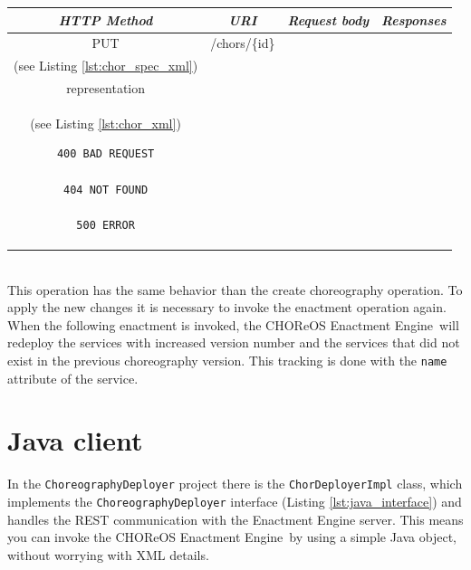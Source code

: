 \documentclass[a4paper, 10pt]{article}
\newcommand{\ee}{CHOReOS Enactment Engine}
\begin{document}
\begin{tabular}{|c|c|c|c|}
\hline 
\itshape{HTTP Method} & \itshape{URI} & \itshape{Request body} & \itshape{Responses} \\ 
\hline 
PUT & /chors/\{id\} & 

\begin{minipage}{2in}
\verb!ChorSpec! XML representation \\ 
(see Listing \ref{lst:chor_spec_xml})
\end{minipage} 
&
\begin{minipage}{2in}
\begin{verbatim}

200 OK
location = "/chors/{id}"
Body: 
\end{verbatim}
\verb!Choreography! XML \\
representation \\
(see Listing \ref{lst:chor_xml})
\begin{verbatim}
400 BAD REQUEST

404 NOT FOUND

500 ERROR

\end{verbatim}
\end{minipage} 
\\ 
\hline 
\end{tabular} \\

This operation has the same behavior than the create choreography operation.
To apply the new changes it is necessary to invoke the enactment operation again.
When the following enactment is invoked, the \ee\ will redeploy the services with increased version number and the services that did not exist in the previous choreography version. This tracking is done with the \texttt{name} attribute of the service.

\section{Java client}
\label{sec:client}

In the \verb!ChoreographyDeployer! project there is the \verb!ChorDeployerImpl! class, which implements the \verb!ChoreographyDeployer! interface (Listing \ref{lst:java_interface}) and handles the REST communication with the Enactment Engine server. This means you can invoke the \ee\ by using a simple Java object, without worrying with XML details.
\end{document}
